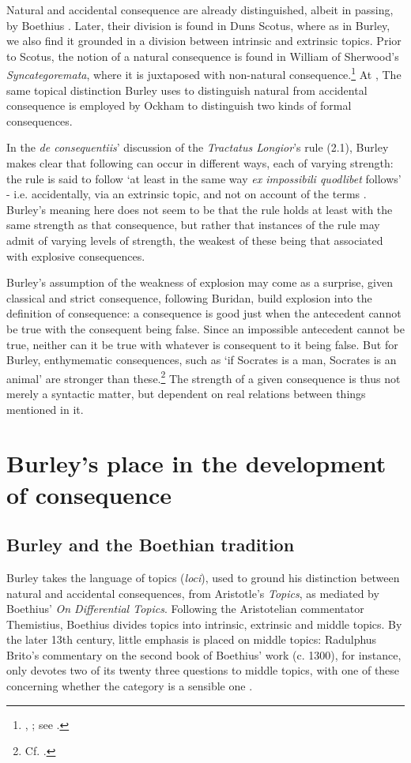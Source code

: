 \documentclass[]{birkjour}
\begin{document}
Natural and accidental consequence are already distinguished, albeit in passing, by Boethius \autocite[835B]{BHS}. Later, their division is found in Duns Scotus, where as in Burley, we also find it grounded in a division between intrinsic and extrinsic topics. Prior to Scotus, the notion of a natural consequence is found in William of Sherwood's \textit{Syncategoremata}, where it is juxtaposed with non-natural consequence.\footnote{\autocite[I, d. 11, q. 2, p. 136-137]{ScotusLectura}, \autocite[p. 80]{Sherwood1941}; see \autocite{Martin2012}.} At \autocite[III-3. 1, p. 589]{OckhamSL}, The same topical distinction Burley uses to distinguish natural from accidental consequence is employed by Ockham to distinguish two kinds of formal consequences.

In the \textit{de consequentiis}' discussion of the \textit{Tractatus Longior}'s rule (2.1), Burley makes clear that following can occur in different ways, each of varying strength: the rule is said to follow `at least in the same way \textit{ex impossibili quodlibet} follows' - i.e. accidentally, via an extrinsic topic, and not on account of the terms \autocite[p. 132, par. 85]{Green-Pedersen1980b}. Burley's meaning here does not seem to be that the rule holds at least with the same strength as that consequence, but rather that instances of the rule may admit of varying levels of strength, the weakest of these being that associated with explosive consequences.

Burley's assumption of the weakness of explosion may come as a surprise, given classical and strict consequence, following Buridan, build explosion into the definition of consequence: a consequence is good just when the antecedent cannot be true with the consequent being false. Since an impossible antecedent cannot be true, neither can it be true with whatever is consequent to it being false. But for Burley, enthymematic consequences, such as `if Socrates is a man, Socrates is an animal' are stronger than these.\footnote{Cf. \autocite[pp. 333-337]{Klima2016}.} The strength of a given consequence is thus not merely a syntactic matter, but dependent on real relations between things mentioned in it. 
\section{Burley's place in the development of consequence}
\subsection{Burley and the Boethian tradition}
Burley takes the language of topics (\textit{loci}), used to ground his distinction between natural and accidental consequences, from Aristotle's \textit{Topics}, as mediated by Boethius' \textit{On Differential Topics}. Following the Aristotelian commentator Themistius, Boethius divides topics into intrinsic, extrinsic and middle topics. By the later 13th century, little emphasis is placed on middle topics: Radulphus Brito's commentary on the second book of Boethius' work (c. 1300), for instance, only devotes two of its twenty three questions to middle topics, with one of these concerning whether the category is a sensible one \autocite{BritoDDT}.
\end{document}
